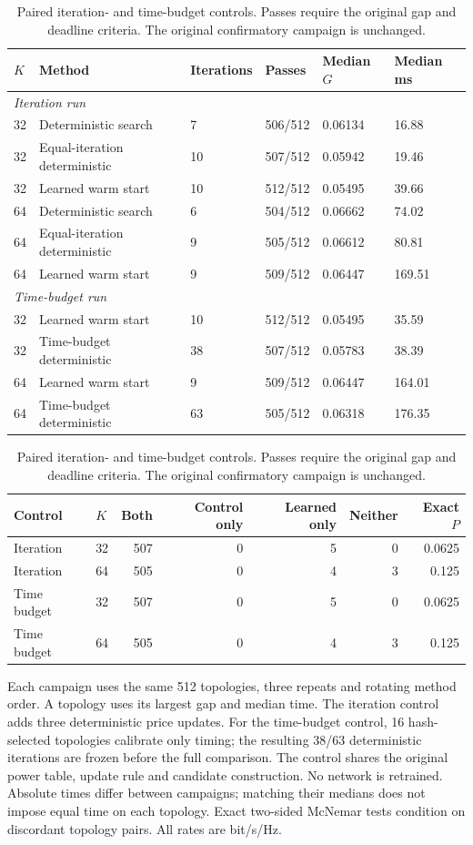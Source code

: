 \begin{table}[htbp]\centering\small
\setlength{\tabcolsep}{4pt}
\caption{Paired iteration- and time-budget controls. Passes require the original gap and deadline criteria. The original confirmatory campaign is unchanged.}\label{supp:compute}
\begin{tabular}{llllll}\toprule
$K$ & Method & Iterations & Passes & Median $G$ & Median ms\\
\midrule
\multicolumn{6}{l}{\textit{Iteration run}}\\
32 & Deterministic search & 7 & 506/512 & 0.06134 & 16.88\\
32 & Equal-iteration deterministic & 10 & 507/512 & 0.05942 & 19.46\\
32 & Learned warm start & 10 & 512/512 & 0.05495 & 39.66\\
64 & Deterministic search & 6 & 504/512 & 0.06662 & 74.02\\
64 & Equal-iteration deterministic & 9 & 505/512 & 0.06612 & 80.81\\
64 & Learned warm start & 9 & 509/512 & 0.06447 & 169.51\\
\multicolumn{6}{l}{\textit{Time-budget run}}\\
32 & Learned warm start & 10 & 512/512 & 0.05495 & 35.59\\
32 & Time-budget deterministic & 38 & 507/512 & 0.05783 & 38.39\\
64 & Learned warm start & 9 & 509/512 & 0.06447 & 164.01\\
64 & Time-budget deterministic & 63 & 505/512 & 0.06318 & 176.35\\
\bottomrule\end{tabular}
\par\medskip\begin{minipage}{\linewidth}\small
\par\smallskip\noindent\begin{tabular}{llrrrrr}\toprule Control & $K$ & Both & Control only & Learned only & Neither & Exact $P$\\\midrule
Iteration & 32 & 507 & 0 & 5 & 0 & 0.0625\\
Iteration & 64 & 505 & 0 & 4 & 3 & 0.125\\
Time budget & 32 & 507 & 0 & 5 & 0 & 0.0625\\
Time budget & 64 & 505 & 0 & 4 & 3 & 0.125\\
\bottomrule\end{tabular}\par\smallskip
Each campaign uses the same 512 topologies, three repeats and rotating method order. A topology uses its largest gap and median time. The iteration control adds three deterministic price updates. For the time-budget control, 16 hash-selected topologies calibrate only timing; the resulting 38/63 deterministic iterations are frozen before the full comparison. The control shares the original power table, update rule and candidate construction. No network is retrained. Absolute times differ between campaigns; matching their medians does not impose equal time on each topology. Exact two-sided McNemar tests condition on discordant topology pairs. All rates are bit/s/Hz.
\end{minipage}
\end{table}
